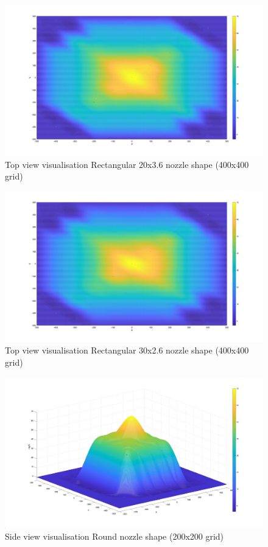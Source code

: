 \begin{figure}
    \centering
    \includegraphics[width=0.75\linewidth]{Images/Rec20_top_400.jpg}
    \caption{Top view visualisation Rectangular 20x3.6 nozzle shape (400x400 grid)}
\end{figure}

\begin{figure}
    \centering
    \includegraphics[width=0.75\linewidth]{Images/Rec30_top_400.jpg}
    \caption{Top view visualisation Rectangular 30x2.6 nozzle shape (400x400 grid)}
\end{figure}





\begin{figure}
    \centering
    \includegraphics[width=0.75\linewidth]{Images/Round_side.jpg}
    \caption{Side view visualisation Round nozzle shape (200x200 grid)}
\end{figure}


